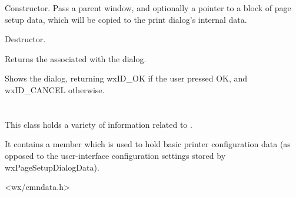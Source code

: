 
Constructor. Pass a parent window, and optionally a pointer to a block of page setup
data, which will be copied to the print dialog's internal data.

\label{wxpagesetupdialogdtor}


Destructor.

\label{wxpagesetupdialoggetpagesetupdata}


Returns the  associated with the dialog.

%
%

\label{wxpagesetupdialogshowmodal}


Shows the dialog, returning wxID\_OK if the user pressed OK, and wxID\_CANCEL
otherwise.

\section{}\label{wxpagesetupdialogdata}

This class holds a variety of information related to .

It contains a  member which is used to hold basic printer configuration data (as opposed to the
user-interface configuration settings stored by wxPageSetupDialogData).




<wx/cmndata.h>


